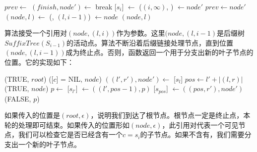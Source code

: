 \documentclass{ctexart}
\begin{document}
\begin{algorithmic}[1]
  \State $prev \gets$   %
  \Loop {}
    \State $(finish, node') \gets$ 
      \State break
    \EndIf
    \State {}[$s_i$] $\gets$ ($(i, \infty)$, )
    \State {} $\gets node'$
    \State $prev \gets node'$
    \State $(node, l) \gets$ (, $(l, i-1)$)
  \EndLoop
  \State {} $\gets node$
  \State \Return $(node, l)$ 
\EndFunction
\end{algorithmic}

算法接受一个引用对$(node, (l, i))$作为参数。这里$(node, (l, i-1)$是后缀树$SuffixTree(S_{i-1})$的活动点。算法不断沿着后缀链接处理节点，直到位置$(node, (l, i-1))$成为终止点。否则，函数返回一个用于分支出新的叶子节点的位置。它的实现如下：

\begin{algorithmic}
      \State \Return (TRUE, $root$)
    \Else
      \State \Return ([$c$] = NIL, $node$)
    \EndIf
  \Else
    \State $((l', r'), node') \gets$ [$s_l$]
    \State $pos \gets l' + |(l, r)|$
      \State \Return (TRUE, $node$)
    \Else
      \State $p \gets$ 
      \State {}[$s_{l'}$] $\gets ((l', pos-1), p)$
      \State {}[$s_{pos}$] $\gets ((pos, r'), node')$
      \State \Return (FALSE, $p$)
    \EndIf
  \EndIf
\EndFunction
\end{algorithmic}

如果传入的位置是$(root, \epsilon)$，说明我们到达了根节点。根节点一定是终止点，本轮的处理即可结束。如果传入的位置形如$(node, \epsilon)$，此引用对代表一个可见节点，我们可以检查它是否已经含有一个$c=s_i$的子节点。如果不含有，我们需要分支出一个新的叶子节点。
\end{document}
